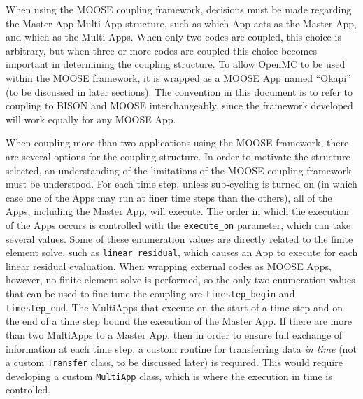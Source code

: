 \documentclass[10pt]{article}
\numberwithin{equation}{section} %
\begin{document}
When using the MOOSE coupling framework, decisions must be made regarding the Master App-Multi App structure, such as which App acts as the Master App, and which as the Multi Apps. When only two codes are coupled, this choice is arbitrary, but when three or more codes are coupled this choice becomes important in determining the coupling structure. To allow OpenMC to be used within the MOOSE framework, it is wrapped as a MOOSE App named ``Okapi'' (to be discussed in later sections). The convention in this document is to refer to coupling to BISON and MOOSE interchangeably, since the framework developed will work equally for any MOOSE App.

When coupling more than two applications using the MOOSE framework, there are several options for the coupling structure. In order to motivate the structure selected, an understanding of the limitations of the MOOSE coupling framework must be understood. For each time step, unless sub-cycling is turned on (in which case one of the Apps may run at finer time steps than the others), all of the Apps, including the Master App, will execute. The order in which the execution of the Apps occurs is controlled with the {\tt execute\_on} parameter, which can take several values. Some of these enumeration values are directly related to the finite element solve, such as {\tt linear\_residual}, which causes an App to execute for each linear residual evaluation. When wrapping external codes as MOOSE Apps, however, no finite element solve is performed, so the only two enumeration values that can be used to fine-tune the coupling are {\tt timestep\_begin} and {\tt timestep\_end}. The MultiApps that execute on the start of a time step and on the end of a time step bound the execution of the Master App. If there are more than two MultiApps to a Master App, then in order to ensure full exchange of information at each time step, a custom routine for transferring data {\it in time} (not a custom {\tt Transfer} class, to be discussed later) is required. This would require developing a custom {\tt MultiApp} class, which is where the execution in time is controlled.
\end{document}
